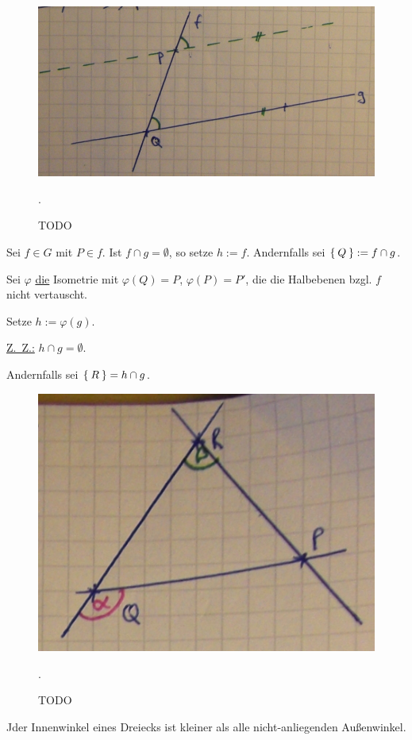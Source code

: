 \begin{figure}
    \centering
    \includegraphics[width=0.5\linewidth, keepaspectratio]{figures/todo/bild-6.jpg}
    \caption{TODO}.
    \label{fig:bild-6}
\end{figure}

\begin{beweis}
    Sei $f \in G$ mit $P \in f$. Ist $f \cap g = \emptyset$, so setze
    $h := f$. Andernfalls sei $\Set{Q} : = f \cap g$.

    Sei $\varphi$ \underline{die} Isometrie mit $\varphi(Q) = P$,
    $\varphi(P) = P'$, die die Halbebenen bzgl. $f$ nicht vertauscht.
    
    Setze $h := \varphi(g)$.

    \underline{Z.~Z.:} $h \cap g = \emptyset$.

    Andernfalls sei $\Set{R} = h \cap g$.

    \begin{figure}
        \centering
        \includegraphics[width=0.5\linewidth, keepaspectratio]{figures/todo/bild-7.jpg}
        \caption{TODO}.
        \label{fig:bild-6}
    \end{figure}
\end{beweis}

\begin{bemerkung}
    Jder Innenwinkel eines Dreiecks ist kleiner als alle nicht-anliegenden
    Außenwinkel.
\end{bemerkung}
